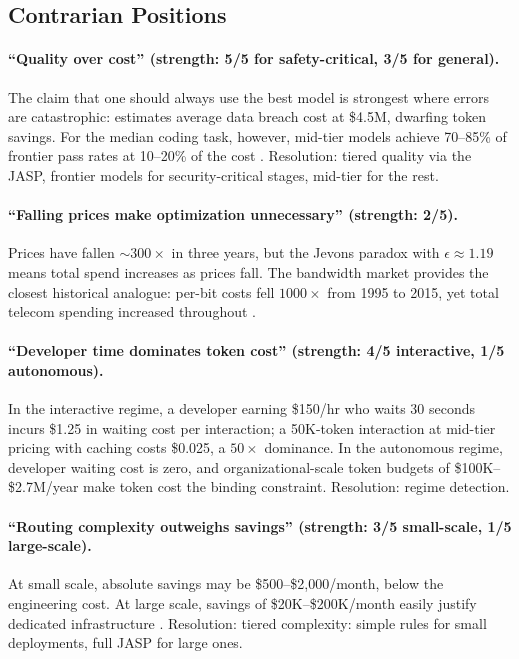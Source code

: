 \subsection{Contrarian Positions}

\paragraph{``Quality over cost'' (strength: 5/5 for safety-critical, 3/5 for general).}
The claim that one should always use the best model is strongest where errors are catastrophic: \citep{ibmponemon2025} estimates average data breach cost at \$4.5M, dwarfing token savings. For the median coding task, however, mid-tier models achieve 70--85\% of frontier pass rates at 10--20\% of the cost \citep{jetbrains2025}. Resolution: tiered quality via the JASP, frontier models for security-critical stages, mid-tier for the rest.

\paragraph{``Falling prices make optimization unnecessary'' (strength: 2/5).}
Prices have fallen $\sim$$300\times$ in three years, but the Jevons paradox with $\epsilon \approx 1.19$ means total spend increases as prices fall. The bandwidth market provides the closest historical analogue: per-bit costs fell $1000\times$ from 1995 to 2015, yet total telecom spending increased throughout \citep{sorrell2009}.

\paragraph{``Developer time dominates token cost'' (strength: 4/5 interactive, 1/5 autonomous).}
In the interactive regime, a developer earning \$150/hr who waits 30 seconds incurs \$1.25 in waiting cost per interaction; a 50K-token interaction at mid-tier pricing with caching costs \$0.025, a $50\times$ dominance. In the autonomous regime, developer waiting cost is zero, and organizational-scale token budgets of \$100K--\$2.7M/year make token cost the binding constraint. Resolution: regime detection.

\paragraph{``Routing complexity outweighs savings'' (strength: 3/5 small-scale, 1/5 large-scale).}
At small scale, absolute savings may be \$500--\$2{,}000/month, below the engineering cost. At large scale, savings of \$20K--\$200K/month easily justify dedicated infrastructure \citep{finops2023}. Resolution: tiered complexity: simple rules for small deployments, full JASP for large ones.

